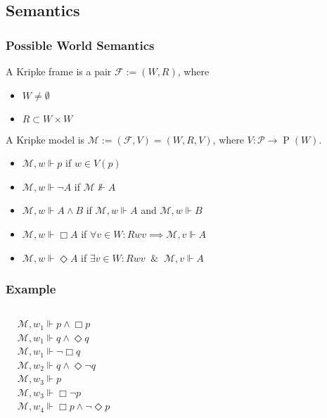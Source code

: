 \documentclass[UTF8,aspectratio=43,11pt,colorlinks,compress,openany]{beamer}%
\begin{document}
\subsection{Semantics}

\begin{frame}\frametitle{Possible World Semantics}
	A Kripke frame is a pair $\mathcal{F}:=(W,R)$, where
	\begin{itemize}
		\item $W\neq\emptyset$
		\item $R\subset W\times W$
	\end{itemize}
	A Kripke model is $\mathcal{M}:=(\mathcal{F},V)=(W,R,V)$, where $V:\mathcal{P}\to \operatorname{P}(W)$.
	\begin{itemize}
		\item $\mathcal{M},w\Vdash p$ if $w\in V(p)$
		\item $\mathcal{M},w\Vdash\neg A$ if $\mathcal{M}\nVdash A$
		\item $\mathcal{M},w\Vdash A\wedge B$ if $\mathcal{M},w\Vdash A$ and $\mathcal{M},w\Vdash B$
		\item $\mathcal{M},w\Vdash\Box A$ if $\forall v\in W: Rwv\implies\mathcal{M},v\Vdash A$
		\item $\mathcal{M},w\Vdash\Diamond A$ if $\exists v\in W: Rwv\;\;\&\;\;\mathcal{M},v\Vdash A$
	\end{itemize}
\end{frame}

\begin{frame}\frametitle{Example}
	\begin{columns}
			\centering{}
			\begin{align*}
			&\mathcal{M},w_1\Vdash p\wedge\Box p\\
			&\mathcal{M},w_1\Vdash q\wedge\Diamond q\\
			&\mathcal{M},w_1\Vdash\neg\Box q\\
			&\mathcal{M},w_2\Vdash q\wedge\Diamond\neg q\\
			&\mathcal{M},w_3\Vdash p\\
			&\mathcal{M},w_3\Vdash\Box\neg p\\
			&\mathcal{M},w_4\Vdash\Box p\wedge\neg\Diamond p
			\end{align*}
	\end{columns}
\end{frame}
\end{document}
